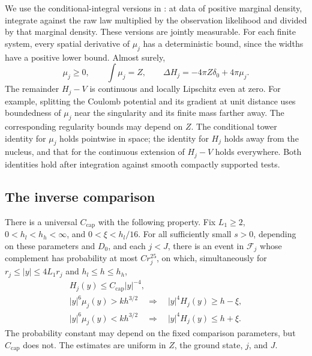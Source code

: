 We use the conditional-integral versions in
\cite[\FoundationObservations]{OuterRadius}: at data of positive marginal density,
integrate against the raw law multiplied by the observation likelihood
and divided by that marginal density.  These versions are jointly
measurable.  For each finite system, every spatial derivative of
$\mu_j$ has a deterministic bound, since the widths have a positive
lower bound.  Almost surely,
\begin{equation}\label{inp:mass-poisson}
 \mu_j\ge0,\qquad \int\mu_j=Z,\qquad
 \Delta H_j=-4\pi Z\delta_0+4\pi\mu_j .
\end{equation}
The remainder $H_j-V$ is continuous and locally Lipschitz even at zero.
For example, splitting the Coulomb potential and its gradient at unit
distance uses boundedness of $\mu_j$ near the singularity and its finite
mass farther away.  The corresponding regularity bounds may depend on
$Z$.  The conditional tower identity for $\mu_j$ holds pointwise in
space; the identity for $H_j$ holds away from the nucleus, and that
for the continuous extension of $H_j-V$ holds everywhere.  Both
identities hold after integration against smooth compactly supported
tests.

\begin{samepage}
\subsection{The inverse comparison}

\begin{proposition}
\label{inp:comparison-prop}
There is a universal $C_{\mathrm{cap}}$ with the following property.
Fix $L_1\ge2$, $0<h_l<h_h<\infty$, and $0<\xi<h_l/16$.
For all sufficiently small $s>0$, depending on these parameters and
$D_0$, and each $j<J$, there is an event in $\mathcal F_j$ whose
complement has probability at most $Cr_j^{25}$, on which, simultaneously
for $r_j\le |y|\le4L_1r_j$ and $h_l\le h\le h_h$,
\begin{equation}\label{inp:comparison}
 \begin{gathered}
 H_j(y)\le C_{\mathrm{cap}}|y|^{-4},\\
 |y|^6\mu_j(y)>kh^{3/2}
       \quad\Longrightarrow\quad |y|^4H_j(y)\ge h-\xi,\\
 |y|^6\mu_j(y)<kh^{3/2}
       \quad\Longrightarrow\quad |y|^4H_j(y)\le h+\xi.
 \end{gathered}
\end{equation}
The probability constant may depend on the fixed comparison
parameters, but $C_{\mathrm{cap}}$ does not.
The estimates are uniform in $Z$, the ground state, $j$, and $J$.
\end{proposition}
\end{samepage}

